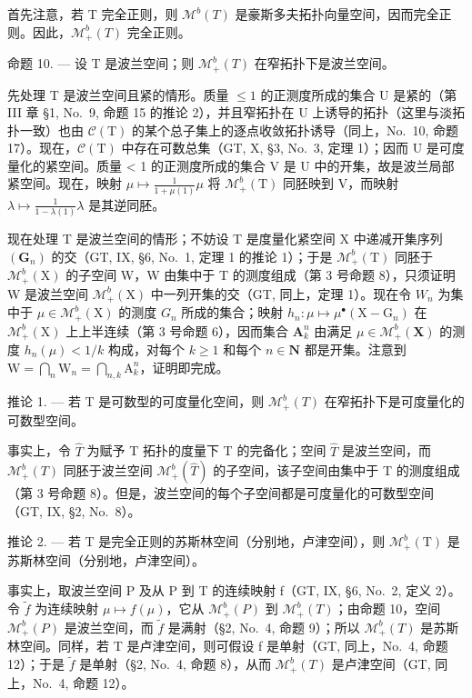 首先注意，若 T 完全正则，则 \(\mathcal{M}^{b}(T)\) 是豪斯多夫拓扑向量空间，因而完全正则。因此，\(\mathcal{M}_{+}^{b}(T)\) 完全正则。

命题 10. --- 设 T 是波兰空间；则 \(\mathcal{M}_{+}^{b}(T)\) 在窄拓扑下是波兰空间。

先处理 T 是波兰空间且紧的情形。质量 \(\leqslant 1\) 的正测度所成的集合 U 是紧的（第 III 章 §1, No.~9, 命题 15 的推论 2），并且窄拓扑在 U 上诱导的拓扑（这里与淡拓扑一致）也由 \(\mathcal{C}(\mathrm{T})\) 的某个总子集上的逐点收敛拓扑诱导（同上，No.~10, 命题 17）。现在，\(\mathcal{C}(\mathrm{T})\) 中存在可数总集（GT, X, §3, No.~3, 定理 1）；因而 U 是可度量化的紧空间。质量 \textless{} 1 的正测度所成的集合 V 是 U 中的开集，故是波兰局部紧空间。现在，映射 \(\mu \mapsto \frac{1}{1 + \mu(1)}\mu\) 将 \(\mathcal{M}_{+}^{b}(\mathrm{T})\) 同胚映到 V，而映射 \(\lambda \mapsto \frac{1}{1 - \lambda(1)}\lambda\) 是其逆同胚。

现在处理 T 是波兰空间的情形；不妨设 T 是度量化紧空间 X 中递减开集序列 \((\mathbf{G}_{n})\) 的交（GT, IX, §6, No.~1, 定理 1 的推论 1）；于是 \(\mathcal{M}_{+}^{b}(\mathrm{T})\) 同胚于 \(\mathcal{M}_{+}^{b}(\mathrm{X})\) 的子空间 W，W 由集中于 T 的测度组成（第 3 号命题 8），只须证明 W 是波兰空间 \(\mathcal{M}_{+}^{b}(\mathrm{X})\) 中一列开集的交（GT, 同上，定理 1）。现在令 \(W_{n}\) 为集中于 \(\mu\in\mathcal{M}_{+}^{b}(\mathrm{X})\) 的测度 \(G_{n}\) 所成的集合；映射 \(h_{n}:\mu\mapsto\mu^{\bullet}(\mathrm{X}-\mathrm{G}_{n})\) 在 \(\mathcal{M}_{+}^{b}(\mathrm{X})\) 上上半连续（第 3 号命题 6），因而集合 \(\mathbf{A}_k^n\) 由满足 \(\mu \in \mathcal{M}_+^b(\mathbf{X})\) 的测度 \(h_n(\mu) < 1 / k\) 构成，对每个 \(k \geqslant 1\) 和每个 \(n \in \mathbf{N}\) 都是开集。注意到 \(\mathrm{W} = \bigcap_{n} \mathrm{W}_n = \bigcap_{n,k} \mathrm{A}_k^n\)，证明即完成。

推论 1. --- 若 T 是可数型的可度量化空间，则 \(\mathcal{M}_{+}^{b}(T)\) 在窄拓扑下是可度量化的可数型空间。

事实上，令 \(\widehat{T}\) 为赋予 T 拓扑的度量下 T 的完备化；空间 \(\widehat{T}\) 是波兰空间，而 \(\mathcal{M}_{+}^{b}(T)\) 同胚于波兰空间 \(\mathcal{M}_{+}^{b}(\widehat{T})\) 的子空间，该子空间由集中于 T 的测度组成（第 3 号命题 8）。但是，波兰空间的每个子空间都是可度量化的可数型空间（GT, IX, §2, No.~8）。

推论 2. --- 若 T 是完全正则的苏斯林空间（分别地，卢津空间），则 \(\mathcal{M}_{+}^{b}(\mathrm{T})\) 是苏斯林空间（分别地，卢津空间）。

事实上，取波兰空间 P 及从 P 到 T 的连续映射 f（GT, IX, §6, No.~2, 定义 2）。令 \(\widetilde{f}\) 为连续映射 \(\mu\mapsto f(\mu)\)，它从 \(\mathcal{M}_{+}^{b}(P)\) 到 \(\mathcal{M}_{+}^{b}(T)\)；由命题 10，空间 \(\mathcal{M}_{+}^{b}(P)\) 是波兰空间，而 \(\widetilde{f}\) 是满射（§2, No.~4, 命题 9）；所以 \(\mathcal{M}_{+}^{b}(T)\) 是苏斯林空间。同样，若 T 是卢津空间，则可假设 f 是单射（GT, 同上，No.~4, 命题 12）；于是 \(\widetilde{f}\) 是单射（§2, No.~4, 命题 8），从而 \(\mathcal{M}_{+}^{b}(T)\) 是卢津空间（GT, 同上，No.~4, 命题 12）。

